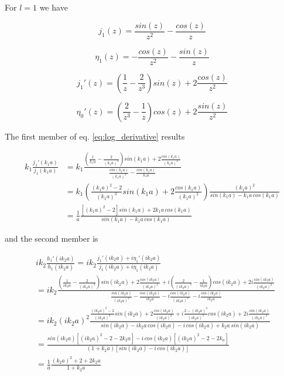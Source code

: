 \documentclass{article}
\begin{document}
For \( l = 1 \) we have

\begin{equation}
j_1(z) = \frac{sin(z)}{z^2} - \frac{cos(z)}{z}
\end{equation}

\begin{equation}
\eta_1(z) = - \frac{cos(z)}{z^2} - \frac{sin(z)}{z}
\end{equation}

\begin{equation}
j_1'(z) = \left( \frac{1}{z} - \frac{2}{z^3} \right) sin(z) + 2 \frac{cos(z)}{z^2}
\end{equation}

\begin{equation}
\eta_0'(z) = \left( \frac{2}{z^3} - \frac{1}{z} \right) cos(z) + 2 \frac{sin(z)}{z^2}
\end{equation}

The first member of eq. \eqref{eq:log_derivative} results

\begin{align}
k_1 \frac{j_1'(k_1a)}{j_1(k_1a)} & = k_1 \frac{ \left( \frac{1}{k_1a} - \frac{2}{(k_1a)^3} \right) sin(k_1a) + 2 \frac{cos(k_1a)}{(k_1a)^2}}{\frac{sin(k_1a)}{(k_1a)^2} - \frac{cos(k_1a)}{k_1a}} \nonumber \\
& = k_1 \left( \frac{(k_1a)^2-2}{(k_1a)^3} sin(k_1a) + 2 \frac{cos(k_1a)}{(k_1a)^2} \right) \frac{(k_1a)^2}{sin(k_1a)-k_1a \, cos(k_1a)} \nonumber \\
& = \frac{1}{a} \frac{\left[ (k_1a)^2 - 2 \right] sin(k_1a) + 2k_1a \, cos(k_1a)}{sin(k_1a) - k_1a \, cos(k_1a)}
\end{align}

and the second member is

\begin{align}
& ik_2 \frac{h_1'(ik_2a)}{h_1(ik_2a)} = ik_2 \frac{j_1'(ik_2a) + i \eta_1'(ik_2a)}{j_1(ik_2a) + i \eta_1(ik_2a)} \nonumber \\
& = ik_2 \frac{\left( \frac{1}{ik_2a} - \frac{2}{(ik_2a)^3} \right) sin(ik_2a) + 2 \frac{cos(ik_2a)}{(ik_2a)^2} + i \left( \frac{2}{(ik_2a)^3} - \frac{1}{ik_2a} \right) cos(ik_2a) + 2i \frac{sin(ik_2a)}{(ik_2a)^2}}{\frac{sin(ik_2a)}{(ik_2a)^2} - \frac{cos(ik_2a)}{ik_2a} - i \frac{cos(ik_2a)}{(ik_2a)^2} - i \frac{sin(ik_2a)}{ik_2a}} \nonumber \\
& = ik_2(ik_2a)^2 \frac{\frac{(ik_2a)^2-2}{(ik_2a)^3}sin(ik_2a) + 2 \frac{cos(ik_2a)}{(ik_2a)^2}+i \frac{2-(ik_2a)^2}{(ik_2a)^3}cos(ik_2a)+2i \frac{sin(ik_2a)}{(ik_2a)^2}}{sin(ik_2a) - ik_2a \, cos(ik_2a) -i \, cos(ik_2a) + k_2a \, sin(ik_2a)} \nonumber \\
& = \frac{sin(ik_2a) \left[(ik_2a)^2 - 2 - 2k_2a \right] - i \, cos(ik_2a) \left[ (ik_2a)^2 -2 - 2k_a \right]}{(1+k_2a) \left[ sin(ik_2a) - i \, cos(ik_2a) \right]} \nonumber \\
& = \frac{1}{a} \frac{(k_2a)^2 + 2 + 2k_2a}{1+k_2a}
\end{align}
\end{document}
